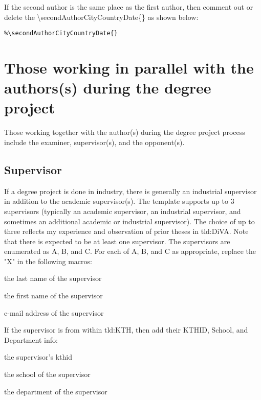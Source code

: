 If the second author is the same place as the first author, then comment out or delete the \textbackslash secondAuthorCityCountryDate\{\} as shown below:
\begin{lstlisting}
%\secondAuthorCityCountryDate{}
\end{lstlisting}

\section{Those working in parallel with the authors(s) during the degree project}
\label{sec:examinerAdvisorsOpponent}
Those working together with the author(s) during the degree project process include the examiner, supervisor(s), and the opponent(s).

\subsection{Supervisor}
\label{sec:supervisorMacros}
If a degree project is done in industry, there is generally an industrial supervisor in addition to the academic supervisor(s). The template supports up to 3 supervisors (typically an academic supervisor, an industrial supervisor, and sometimes an additional academic or industrial supervisor). The choice of up to three reflects my experience and observation of prior theses in \gls{tld:DiVA}. Note that there is expected to be at least one supervisor. The supervisors are enumerated as A, B, and C. For each of A, B, and C as appropriate, replace the "X" in the following macros:
\begin{description}[leftmargin=!, labelwidth =\widthof{\texttt{\textbackslash secondAuthorsFirstname\{\}}}]
\item [\texttt{\textbackslash supervisorXsLastname\{\}}] the last name of the supervisor
\item [\texttt{\textbackslash supervisorXsFirstname\{\}}] the first name of the supervisor
\item [\texttt{\textbackslash supervisorXsEmail\{\}}] e-mail address of the supervisor
\end{description}

If the supervisor is from within \gls{tld:KTH}, then add their KTHID, School, and Department info:
\begin{description}[leftmargin=!, labelwidth =\widthof{\texttt{\textbackslash secondAuthorsFirstname\{\}}}]
\item [\texttt{\textbackslash supervisorXsKTHID\{\}}] the supervisor's kthid 
\item [\texttt{\textbackslash supervisorXsSchool\{\}}] the school of the supervisor
\item [\texttt{\textbackslash supervisorXsDepartment\{\}}] the department of the supervisor
\end{description}

